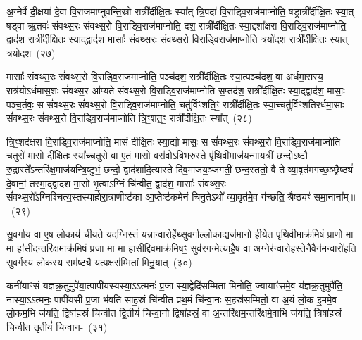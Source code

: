 {\anuvakamend[{अ॒ग्निस्तथ्स॒ꣴ॒स्कृत्या॒ग्नेर्दश॑ च}]}

अ॒ग्नेर्वै दी॒क्षया॑ दे॒वा वि॒राज॑माप्नुवन्ति॒स्रो रात्री᳚र्दीक्षि॒तः स्या᳚त् त्रि॒पदा॑ वि॒राड्वि॒राज॑\-माप्नोति॒ षड्रात्री᳚र्दीक्षि॒तः स्या॒त् षड्वा ऋ॒तवः॑ संवथ्स॒रः सं॑वथ्स॒रो वि॒राड्वि॒राज॑\-माप्नोति॒ दश॒ रात्री᳚र्दीक्षि॒तः स्या॒द्दशा᳚क्षरा वि॒राड्वि॒राज॑\-माप्नोति॒ द्वाद॑श॒ रात्री᳚र्दीक्षि॒तः स्या॒द्द्वाद॑श॒ मासाः᳚ संवथ्स॒रः सं॑वथ्स॒रो वि॒राड्वि॒राज॑\-माप्नोति॒ त्रयो॑दश॒ रात्री᳚र्दीक्षि॒तः स्या॒त् त्रयो॑दश॒~(२७)\ip

मासाः᳚ संवथ्स॒रः सं॑वथ्स॒रो वि॒राड्वि॒राज॑\-माप्नोति॒ पञ्च॑दश॒ रात्री᳚र्दीक्षि॒तः स्या॒त्पञ्च॑दश॒ वा अ॑र्धमा॒सस्य॒ रात्र॑यो\-ऽर्धमास॒शः सं॑वथ्स॒र आ᳚प्यते संवथ्स॒रो वि॒राड्वि॒राज॑\-माप्नोति स॒प्तद॑श॒ रात्री᳚र्दीक्षि॒तः स्या॒द्द्वाद॑श॒ मासाः॒ पञ्च॒र्तवः॒ स सं॑वथ्स॒रः सं॑वथ्स॒रो वि॒राड्वि॒राज॑\-माप्नोति॒ चतु॑र्विꣳशति॒ꣳ॒ रात्री᳚र्दीक्षि॒तः स्या॒च्चतु॑र्विꣳशतिरर्धमा॒साः सं॑वथ्स॒रः सं॑वथ्स॒रो वि॒राड्वि॒राज॑\-माप्नोति त्रि॒ꣳ॒शत॒ꣳ॒ रात्री᳚र्दीक्षि॒तः स्या᳚त्~(२८)\ip

त्रि॒ꣳ॒शद॑क्षरा वि॒राड्वि॒राज॑\-माप्नोति॒ मासं॑ दीक्षि॒तः स्या॒द्यो मासः॒ स सं॑वथ्स॒रः सं॑वथ्स॒रो वि॒राड्वि॒राज॑\-माप्नोति च॒तुरो॑ मा॒सो दी᳚क्षि॒तः स्या᳚च्च॒तुरो॒ वा ए॒तं मा॒सो वस॑वो\-ऽबिभरु॒स्ते पृ॑थि॒वीमाज॑यन्गाय॒त्रीं छन्दो॒\-ऽष्टौ रु॒द्रास्ते᳚\-ऽन्तरि॑क्ष॒माज॑यन्त्रि॒ष्टुभं॒ छन्दो॒ द्वाद॑शादि॒त्यास्ते दिव॒माज॑य॒ञ्जग॑तीं॒ छन्द॒स्ततो॒ वै ते व्या॒वृत॑मगच्छ॒ञ्छ्रैष्ठ्यं॑ दे॒वानां॒ तस्मा॒द्द्वाद॑श मा॒सो भृ॒त्वा\-ऽग्निं चि॑न्वीत॒ द्वाद॑श॒ मासाः᳚ संवथ्स॒रः सं॑वथ्स॒रो᳚\-ऽग्निश्चित्य॒स्तस्या॑होरा॒त्राणीष्ट॑का आ॒प्तेष्ट॑कमेनं चिनु॒ते\-ऽथो᳚ व्या॒वृत॑मे॒व ग॑च्छति॒ श्रैष्ठ्यꣳ॑ समा॒नाना᳚म्॥~(२९)\ip

{\anuvakamend[{स्या॒त् त्रयो॑दश त्रि॒ꣳ॒शत॒ꣳ॒ रात्री᳚र्दीक्षि॒तः स्या॒द्वै ते᳚\-ऽष्टाविꣳ॑शतिश्च}]}

सु॒व॒र्गाय॒ वा ए॒ष लो॒काय॑ चीयते॒ यद॒ग्निस्तं यन्नान्वा॒रोहे᳚थ्सुव॒र्गाल्लो॒काद्यज॑मानो हीयेत पृथि॒वीमाक्र॑मिषं प्रा॒णो मा॒ मा हा॑सीद॒न्तरि॑क्ष॒माक्र॑मिषं प्र॒जा मा॒ मा हा॑सी॒द्दिव॒माक्र॑मिष॒ꣳ॒ सुव॑रग॒न्मेत्या॑है॒ष वा अ॒ग्नेर॑न्वारो॒हस्तेनै॒वैन॑\-म॒न्वारो॑हति सुव॒र्गस्य॑ लो॒कस्य॒ सम॑ष्ट्यै॒ यत्प॒क्षस॑म्मितां मिनु॒यात्~(३०)\ip

कनी॑याꣳसं यज्ञक्र॒तुमुपे॑या॒त्पापी॑यस्यस्या॒\-ऽऽत्मनः॑ प्र॒जा स्या॒द्वेदि॑सम्मितां मिनोति॒ ज्यायाꣳ॑समे॒व य॑ज्ञक्र॒तुमुपै॑ति॒ नास्या॒\-ऽऽत्मनः॒ पापी॑यसी प्र॒जा भ॑वति साह॒स्रं चि॑न्वीत प्रथ॒मं चि॑न्वा॒नः स॒हस्र॑सम्मितो॒ वा अ॒यं लो॒क इ॒ममे॒व लो॒कम॒भि ज॑यति॒ द्विषा॑हस्रं चिन्वीत द्वि॒तीयं॑ चिन्वा॒नो द्विषा॑हस्रं॒ वा अ॒न्तरि॑क्षम॒न्तरि॑क्षमे॒वाभि ज॑यति॒ त्रिषा॑हस्रं चिन्वीत तृ॒तीयं॑ चिन्वा॒न-~(३१)\ip

